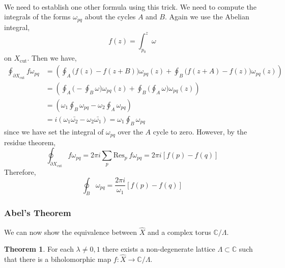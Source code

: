 \documentclass[12pt]{extarticle}
\newcommand{\C}{\mathbb{C}}
\theoremstyle{definition}
\newtheorem{theorem}{Theorem}[section]
\newcommand{\Res}[2]{\mathrm{Res}_{#1} \: #2}
\newcommand{\Xcut}{X_{\text{cut}}}
\begin{document}
\bigskip\\
We need to establish one other formula using this trick. We need to compute the integrals of the forms $\omega_{pq}$ about the cycles $A$ and $B$. Again we use the Abelian integral,
\[ f(z) = \int_{p_0}^z \omega \]
on $\Xcut$. Then we have,
\begin{align*}
\oint_{\partial \Xcut} f \omega_{pq} & = \left( \oint_A \Big( f(z)  - f(z + B) \Big) \omega_{pq}(z) + \oint_B \Big( f(z + A) - f(z) \Big) \omega_{pq}(z) \right)
\\
& = \left( \oint_A \Big( - \oint_B \omega \Big) \omega_{pq}(z) + \oint_B \Big( \oint_A \omega \Big) \omega_{pq}(z) \right)
\\
& = \left( \omega_1  \oint_B \omega_{pq}  - \omega_2 \oint_A \omega_{pq} \right)
\\
& = i \left( \omega_1 \bar{\omega_2} - \omega_2 \bar{\omega_1} \right) = \omega_1 \oint_B \omega_{pq} 
\end{align*} 
since we have set the integral of $\omega_{pq}$ over the $A$ cycle to zero. However, by the residue theorem,
\[ \oint_{\partial \Xcut} f \omega_{pq} = 2 \pi i \sum_{p} \Res{p}{f \omega_{pq}} = 2 \pi i \left[ f(p) - f(q) \right] \]
Therefore, 
\[ \oint_B \omega_{pq} = \frac{2 \pi i}{\omega_1} \left[ f(p) - f(q) \right] \]

\subsubsection{Abel's Theorem}

We can now show the equivalence between $\hat{X}$ and a complex torus $\C / \Lambda$. 

\begin{theorem}
For each $\lambda \neq 0, 1$ there exists a non-degenerate lattice $\Lambda \subset \C$ such that there is a biholomorphic map $f : \hat{X} \to \C / \Lambda$. 
\end{theorem}
\end{document}
